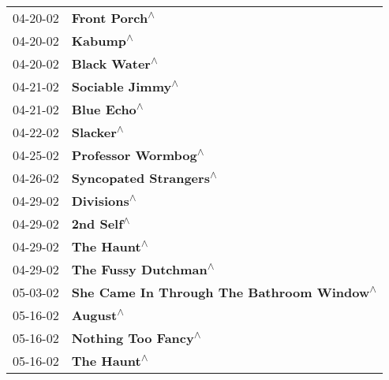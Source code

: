 \begin{supertabular}{p{0.25\columnwidth}p{0.75\columnwidth}}
 04-20-02 &                                                              \textbf{Front Porch\textsuperscript{$\wedge$}} \\
 04-20-02 &                                                                   \textbf{Kabump\textsuperscript{$\wedge$}} \\
 04-20-02 &                                                              \textbf{Black Water\textsuperscript{$\wedge$}} \\
 04-21-02 &                                                           \textbf{Sociable Jimmy\textsuperscript{$\wedge$}} \\
 04-21-02 &                                                                \textbf{Blue Echo\textsuperscript{$\wedge$}} \\
 04-22-02 &                                                                  \textbf{Slacker\textsuperscript{$\wedge$}} \\
 04-25-02 &                                                        \textbf{Professor Wormbog\textsuperscript{$\wedge$}} \\
 04-26-02 &                                                     \textbf{Syncopated Strangers\textsuperscript{$\wedge$}} \\
 04-29-02 &                                                                \textbf{Divisions\textsuperscript{$\wedge$}} \\
 04-29-02 &                                                                 \textbf{2nd Self\textsuperscript{$\wedge$}} \\
 04-29-02 &                                                                \textbf{The Haunt\textsuperscript{$\wedge$}} \\
 04-29-02 &                                                       \textbf{The Fussy Dutchman\textsuperscript{$\wedge$}} \\
 05-03-02 &                                  \textbf{She Came In Through The Bathroom Window\textsuperscript{$\wedge$}} \\
 05-16-02 &                                                                   \textbf{August\textsuperscript{$\wedge$}} \\
 05-16-02 &                                                        \textbf{Nothing Too Fancy\textsuperscript{$\wedge$}} \\
 05-16-02 &                                                                \textbf{The Haunt\textsuperscript{$\wedge$}} \\

\end{supertabular}
